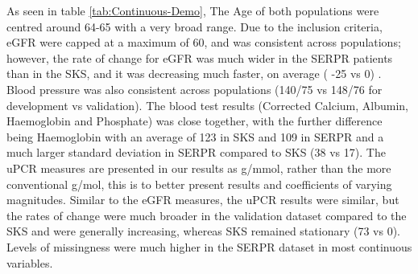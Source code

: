\documentclass[12pt,PhD,twoside,openright]{muthesis}
\begin{document}
As seen in table \ref{tab:Continuous-Demo}, The Age of both populations were centred around 64-65 with a very broad range. Due to the inclusion criteria, eGFR were capped at a maximum of 60, and was consistent across populations; however, the rate of change for eGFR was much wider in the SERPR patients than in the SKS, and it was decreasing much faster, on average ( -25 vs 0) . Blood pressure was also consistent across populations (140/75 vs 148/76 for development vs validation). The blood test results (Corrected Calcium, Albumin, Haemoglobin and Phosphate) was close together, with the further difference being Haemoglobin with an average of 123 in SKS and 109 in SERPR and a much larger standard deviation in SERPR compared to SKS (38 vs 17). The uPCR measures are presented in our results as g/mmol, rather than the more conventional g/mol, this is to better present results and coefficients of varying magnitudes. Similar to the eGFR measures, the uPCR results were similar, but the rates of change were much broader in the validation dataset compared to the SKS and were generally increasing, whereas SKS remained stationary (73 vs 0). Levels of missingness were much higher in the SERPR dataset in most continuous variables.
\end{document}

